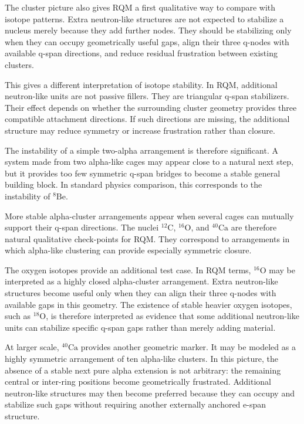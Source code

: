 \documentclass[11pt,a4paper]{article}
\begin{document}
The cluster picture also gives RQM a first qualitative way to compare with isotope patterns. Extra neutron-like structures are not expected to stabilize a nucleus merely because they add further nodes. They should be stabilizing only when they can occupy geometrically useful gaps, align their three q-nodes with available q-span directions, and reduce residual frustration between existing clusters.

This gives a different interpretation of isotope stability. In RQM, additional neutron-like units are not passive fillers. They are triangular q-span stabilizers. Their effect depends on whether the surrounding cluster geometry provides three compatible attachment directions. If such directions are missing, the additional structure may reduce symmetry or increase frustration rather than closure.

The instability of a simple two-alpha arrangement is therefore significant. A system made from two alpha-like cages may appear close to a natural next step, but it provides too few symmetric q-span bridges to become a stable general building block. In standard physics comparison, this corresponds to the instability of \(^{8}\mathrm{Be}\).

More stable alpha-cluster arrangements appear when several cages can mutually support their q-span directions. The nuclei \(^{12}\mathrm{C}\), \(^{16}\mathrm{O}\), and \(^{40}\mathrm{Ca}\) are therefore natural qualitative check-points for RQM. They correspond to arrangements in which alpha-like clustering can provide especially symmetric closure.

The oxygen isotopes provide an additional test case. In RQM terms, \(^{16}\mathrm{O}\) may be interpreted as a highly closed alpha-cluster arrangement. Extra neutron-like structures become useful only when they can align their three q-nodes with available gaps in this geometry. The existence of stable heavier oxygen isotopes, such as \(^{18}\mathrm{O}\), is therefore interpreted as evidence that some additional neutron-like units can stabilize specific q-span gaps rather than merely adding material.

At larger scale, \(^{40}\mathrm{Ca}\) provides another geometric marker. It may be modeled as a highly symmetric arrangement of ten alpha-like clusters. In this picture, the absence of a stable next pure alpha extension is not arbitrary: the remaining central or inter-ring positions become geometrically frustrated. Additional neutron-like structures may then become preferred because they can occupy and stabilize such gaps without requiring another externally anchored e-span structure.
\end{document}
